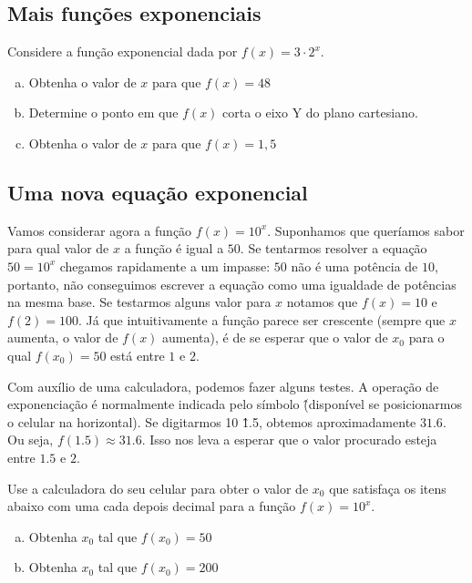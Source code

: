 \documentclass[main_estudante.tex]{subfiles}
\begin{document}
\subsection*{Mais funções exponenciais}

\begin{questao}
Considere a função exponencial dada por $f(x)=3 \cdot 2^x$.
\begin{enumerate}[a)]
\item Obtenha o valor de $x$ para que $f(x)=48$
\item Determine o ponto em que $f(x)$ corta o eixo Y do plano cartesiano.
\item Obtenha o valor de $x$ para que $f(x)=1,5$
\end{enumerate}
\end{questao}

\subsection*{Uma nova equação exponencial}

Vamos considerar agora a função $f(x)=10^x$. Suponhamos que queríamos sabor para qual valor de $x$ a função é igual a $50$. Se tentarmos resolver a equação $50=10^x$ chegamos rapidamente a um impasse: $50$ não é uma potência de $10$, portanto, não conseguimos escrever a equação como uma igualdade de potências na mesma base. Se testarmos alguns valor para $x$ notamos que $f(x)=10$ e $f(2)=100$. Já que intuitivamente a função parece ser crescente (sempre que $x$ aumenta, o valor de $f(x)$ aumenta), é de se esperar que o valor de $x_0$ para o qual $f(x_0)=50$ está entre $1$ e $2$.

Com auxílio de uma calculadora, podemos fazer alguns testes. A operação de exponenciação é normalmente indicada pelo símbolo \^ (disponível se posicionarmos o celular na horizontal). Se digitarmos 10 \^ 1.5, obtemos aproximadamente $31.6$. Ou seja, $f(1.5) \approx 31.6$. Isso nos leva a esperar que o valor procurado esteja entre $1.5$ e $2$.

\begin{questao}
Use a calculadora do seu celular para obter o valor de $x_0$ que satisfaça os itens abaixo com uma cada depois decimal para a função $f(x)=10^x$.
\begin{enumerate}[a)]
\item Obtenha $x_0$ tal que $f(x_0)=50$
\item Obtenha $x_0$ tal que $f(x_0)=200$
\end{enumerate}
\end{questao}
\end{document}

